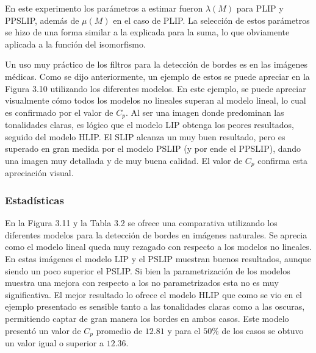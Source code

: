 En este experimento los par\'ametros a estimar fueron $\lambda(M)$ para PLIP y PPSLIP, adem\'as de $\mu(M)$ en el caso de PLIP. La selecci\'on de estos par\'ametros se hizo de una forma similar a la explicada para la suma, lo que obviamente aplicada a la funci\'on del isomorfismo.

Un uso muy pr\'actico de los filtros para la detecci\'on de bordes es en las im\'agenes m\'edicas. Como se dijo anteriormente, un ejemplo de estos se puede apreciar en la Figura 3.10 utilizando los diferentes modelos. En este ejemplo, se puede apreciar visualmente c\'omo todos los modelos no lineales superan al modelo lineal, lo cual es confirmado por el valor de $C_p$. Al ser una imagen donde predominan las tonalidades claras, es l\'ogico que el modelo LIP obtenga los peores resultados, seguido del modelo HLIP. El SLIP alcanza un muy buen resultado, pero es superado en gran medida por el modelo PSLIP (y por ende el PPSLIP), dando una imagen muy detallada y de muy buena calidad. El valor de $C_p$ confirma esta apreciaci\'on visual.

\subsubsection{Estad\'isticas}

En la Figura 3.11 y la Tabla 3.2 se ofrece una comparativa utilizando los diferentes modelos para la detecci\'on de bordes en im\'agenes naturales. Se aprecia como el modelo lineal queda muy rezagado con respecto a los modelos no lineales. En estas im\'agenes el modelo LIP y el PSLIP muestran buenos resultados, aunque siendo un poco superior el PSLIP. Si bien la parametrizaci\'on de los modelos muestra una mejora con respecto a los no parametrizados esta no es muy significativa. El mejor resultado lo ofrece el modelo HLIP que como se vio en el ejemplo presentado es sensible tanto a las tonalidades claras como a las oscuras, permitiendo captar de gran manera los bordes en ambos casos. Este modelo present\'o un valor de $C_p$ promedio de $12.81$ y para el $50\%$ de los casos se obtuvo un valor igual o superior a $12.36$. 

